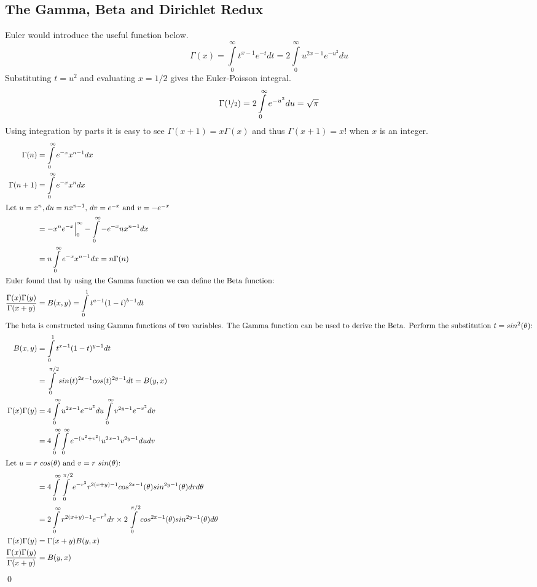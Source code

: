\documentclass{article}%
\theoremstyle{definition}
\begin{document}
\subsection{The Gamma, Beta and Dirichlet Redux}
Euler would introduce the useful function below. 
\[\Gamma(x) = \int\limits_{0}^{\infty}t^{x-1}e^{-t}dt = 2\int\limits_{0}^{\infty}u^{2x-1}e^{-u^2}du \]
Substituting $t = u^2$ and evaluating $x = 1/2$ gives the Euler-Poisson integral. 
\[\Gamma(\nicefrac{1}{2}) = 2\int\limits_{0}^{\infty}e^{-u^2}du = \sqrt{\pi}\]
Using integration by parts it is easy to see $\Gamma(x+1) = x\Gamma(x)$ and thus $\Gamma(x+1) = x!$ when $x$ is an integer. 
\begin{align*}
\Gamma(n) &= \int\limits_{0}^{\infty}e^{-x}x^{n-1}dx \\
\Gamma(n+1) &= \int\limits_{0}^{\infty}e^{-x}x^{n}dx \\
\intertext{Let $u=x^n, du = nx^{n-1}$, $dv=e^{-x}$ and $v=-e^{-x}$}
&= -x^{n}e^{-x}\Big|_0^{\infty} - \int\limits_{0}^{\infty}-e^{-x}nx^{n-1}dx \\
&= n \int\limits_{0}^{\infty}e^{-x}x^{n-1}dx = n\Gamma(n) \\
\intertext{Euler found that by using the Gamma function we can define the Beta function:}
\frac{\Gamma(x)\Gamma(y)}{\Gamma(x+y)} &= B(x,y) = \int\limits_{0}^{1}t^{a-1} (1-t)^{b-1}dt \\
\intertext{The beta is constructed using Gamma functions of two variables. The Gamma function can be used to derive the Beta. Perform the substitution $t = sin^2(\theta)$:}
B(x,y) &= \int\limits_{0}^{1}t^{x-1}(1-t)^{y-1}dt 
\\&= \int \limits_{0}^{\pi/2}sin(t)^{2x-1}cos(t)^{2y-1}dt = B(y,x)\\
\Gamma(x)\Gamma(y) &= 4 \int\limits_{0}^{\infty}u^{2x-1}e^{-u^2}du\int\limits_{0}^{\infty}v^{2y-1}e^{-v^2}dv \\
&= 4 \int\limits_{0}^{\infty}\int\limits_{0}^{\infty}e^{-(u^2+v^2)}u^{2x-1}v^{2y-1}du dv \\
\intertext{Let $u = r \ cos (\theta)$  and $v = r \ sin (\theta)$:}
&= 4 \int\limits_{0}^{\infty}\int\limits_{0}^{\pi/2}e^{-r^2}r^{2(x+y)-1}cos^{2x-1}(\theta)sin^{2y-1}(\theta) dr d\theta \\
&= 2 \int\limits_{0}^{\infty}r^{2(x+y)-1}e^{-r^2}dr \times 2\int\limits_{0}^{\pi/2}cos^{2x-1}(\theta)sin^{2y-1}(\theta) d\theta \\
\Gamma(x)\Gamma(y)&= \Gamma(x+y)B(y,x) \\
\frac{\Gamma(x)\Gamma(y)}{\Gamma(x+y)} &= B(y,x)
\end{align*}
\qed
\end{document}
